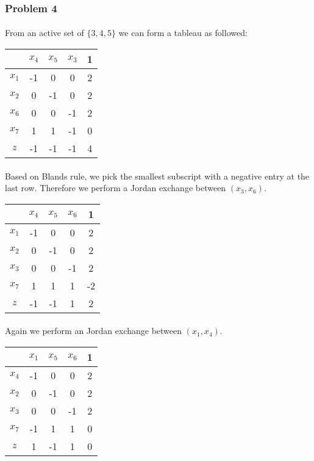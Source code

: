 \subsubsection*{Problem 4}
\paragraph{}
From an active set of $\{3,4,5\}$ we can form a tableau as followed:
\begin{center}
	\begin{tabular}{ c | c  c  c | c }
		\      & $x_4$ & $x_5$ & $x_3$ &   1 \\ \hline
		$x_1$  &    -1 &     0 &     0 &   2 \\ 
		$x_2$  &     0 &    -1 &     0 &   2 \\ 
		$x_6$  &     0 &     0 &    -1 &   2 \\
		$x_7$  &     1 &     1 &    -1 &   0 \\ \hline
		$z$    &    -1 &    -1 &    -1 &   4 \\ 		
	\end{tabular}
\end{center}
\paragraph{}
Based on Blands rule, we pick the smallest subscript with a negative entry at the last row. Therefore we perform a Jordan exchange between $(x_3, x_6)$.
\begin{center}
	\begin{tabular}{ c | c  c  c | c }
		\      & $x_4$ & $x_5$ & $x_6$ &   1 \\ \hline
		$x_1$  &    -1 &     0 &     0 &   2 \\ 
		$x_2$  &     0 &    -1 &     0 &   2 \\ 
		$x_3$  &     0 &     0 &    -1 &   2 \\
		$x_7$  &     1 &     1 &     1 &  -2 \\ \hline
		$z$    &    -1 &    -1 &     1 &   2 \\ 		
	\end{tabular}
\end{center}
\paragraph{}
Again we perform an Jordan exchange between $(x_1, x_4)$.
\begin{center}
	\begin{tabular}{ c | c  c  c | c }
		\      & $x_1$ & $x_5$ & $x_6$ &   1 \\ \hline
		$x_4$  &    -1 &     0 &     0 &   2 \\ 
		$x_2$  &     0 &    -1 &     0 &   2 \\ 
		$x_3$  &     0 &     0 &    -1 &   2 \\
		$x_7$  &    -1 &     1 &     1 &   0 \\ \hline
		$z$    &     1 &    -1 &     1 &   0 \\ 		
	\end{tabular}
\end{center}
